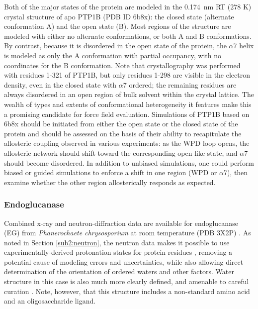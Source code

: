 \documentclass[9pt,review]{livecoms}
\begin{document}
Both of the major states of the protein are modeled in the \qty{0.174}{\nano\meter} RT (278 K) crystal structure of apo PTP1B (PDB ID 6b8x): the closed state (alternate conformation A) and the open state (B).
Most regions of the structure are modeled with either no alternate conformations, or both A and B conformations.
By contrast, because it is disordered in the open state of the protein, the $\alpha$7 helix is modeled as only the A conformation with partial occupancy, with no coordinates for the B conformation.
Note that crystallography was performed with residues 1-321 of PTP1B, but only residues 1-298 are visible in the electron density, even in the closed state with $\alpha$7 ordered; the remaining residues are always disordered in an open region of bulk solvent within the crystal lattice.
The wealth of types and extents of conformational heterogeneity it features make this a promising candidate for force field evaluation.
Simulations of PTP1B based on 6b8x should be initiated from either the open state or the closed state of the protein and should be assessed on the basis of their ability to recapitulate the allosteric coupling observed in various experiments: as the WPD loop opens, the allosteric network should shift toward the corresponding open-like state, and $\alpha$7 should become disordered.
In addition to unbiased simulations, one could perform biased or guided simulations to enforce a shift in one region (WPD or $\alpha$7), then examine whether the other region allosterically responds as expected.

\subsubsection{Endoglucanase}
\label{sub2:endoglucanase}

Combined x-ray and neutron-diffraction data are available for endoglucanase (EG) from \textit{Phanerochaete chrysosporium} at room temperature (PDB 3X2P) \cite{nakamura_newtons_2015}.
As noted in Section \ref{sub2:neutron}, the neutron data  makes it possible to use experimentally-derived protonation states for protein residues \cite{blakeley_neutron_2009,chen_direct_2012,ashkar_neutron_2018}, removing a potential cause of modeling errors and uncertainties, while also allowing direct determination of the orientation of ordered waters and other factors.
Water structure in this case is also much more clearly defined, and amenable to careful curation \cite{blakeley_15-k_2004,wall_biomolecular_2019}.
Note, however, that this structure includes a non-standard amino acid and an oligosaccharide ligand.
\end{document}
